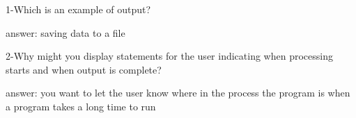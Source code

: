 1-Which is an example of output?


answer: saving data to a file

2-Why might you display statements for the user indicating when processing starts and when output is complete?


answer:  you want to let the user know where in the process the program is when a program takes a long time to run

